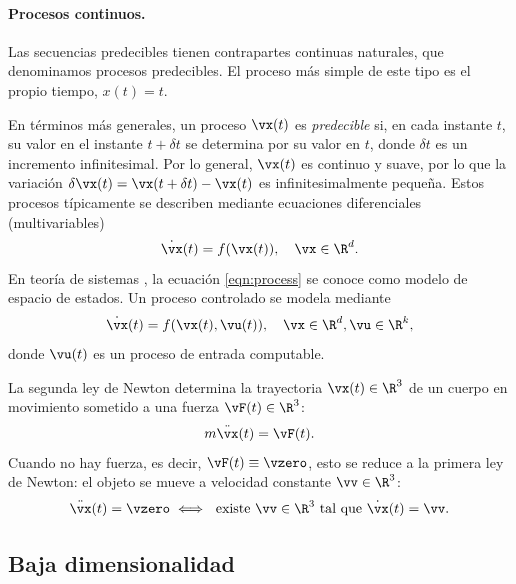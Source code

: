 \documentclass[../../book-main_es.tex]{subfiles}
\begin{document}
\paragraph{Procesos continuos.}
Las secuencias predecibles tienen contrapartes continuas naturales,
que denominamos procesos predecibles. El proceso más simple de este
tipo es el propio tiempo,
\(x(t) = t\).

En términos más generales, un proceso \(\vx(t)\) es \textit{predecible} si,
en cada instante \(t\), su valor en el instante \(t + \delta t\) se
determina por su valor en \(t\), donde \(\delta t\) es un incremento
infinitesimal. Por lo general, \(\vx(t)\) es continuo y suave, por lo que 
la variación \(\delta \vx(t) = \vx(t + \delta t) - \vx(t)\) es 
infinitesimalmente pequeña. Estos procesos típicamente se describen
mediante ecuaciones diferenciales (multivariables)
\begin{equation}
    \dot{\vx}(t) = f(\vx(t)), \quad \vx \in \R^{d}.
    \label{eqn:process}
\end{equation}
En teoría de sistemas \cite{Cal:Des,Sastry-Nonlinear}, la ecuación
\eqref{eqn:process} se conoce como modelo de espacio de estados. Un
proceso controlado se modela mediante
\begin{equation}
    \dot{\vx}(t) = f(\vx(t), \vu(t)), \quad \vx \in \R^{d}, \vu \in \R^{k},
    \label{eqn:process-controlled}
\end{equation}
donde \(\vu(t)\) es un proceso de entrada computable.

\begin{example}
    La segunda ley de Newton determina la trayectoria \(\vx(t) \in \R^{3}\)
    de un cuerpo en movimiento sometido a una fuerza \(\vF(t) \in \R^{3}\):
    \begin{equation}
        m\ddot{\vx}(t) = \vF(t).
        \label{eqn:newton-second}
    \end{equation}
    Cuando no hay fuerza, es decir, \(\vF(t) \equiv \vzero\), esto se
    reduce a la primera ley de Newton: el objeto se mueve a velocidad
    constante \(\vv \in \R^{3}\):
    \begin{equation}
        \ddot{\vx}(t) = \vzero \iff \ \text{existe } \vv \in
        \R^{3} \text{ tal que } \dot{\vx}(t) = \vv.
        \label{eqn:newton-first}
    \end{equation}
\end{example}

\subsection{Baja dimensionalidad}\label{sec:intro-low-dimensionality}
\end{document}

